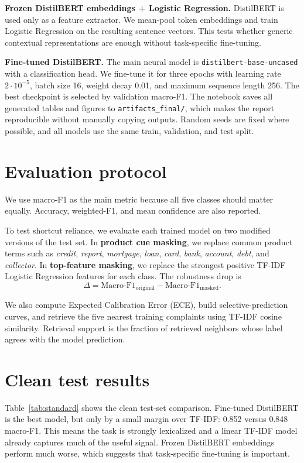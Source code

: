 \documentclass[11pt,twocolumn]{article}
\begin{document}
\textbf{Frozen DistilBERT embeddings + Logistic Regression.} DistilBERT is used only as a feature extractor. We mean-pool token embeddings and train Logistic Regression on the resulting sentence vectors. This tests whether generic contextual representations are enough without task-specific fine-tuning.

\textbf{Fine-tuned DistilBERT.} The main neural model is \texttt{distilbert-base-uncased} with a classification head. We fine-tune it for three epochs with learning rate $2\cdot10^{-5}$, batch size 16, weight decay 0.01, and maximum sequence length 256. The best checkpoint is selected by validation macro-F1. The notebook saves all generated tables and figures to \texttt{artifacts\_final/}, which makes the report reproducible without manually copying outputs. Random seeds are fixed where possible, and all models use the same train, validation, and test split.

\section{Evaluation protocol}
We use macro-F1 as the main metric because all five classes should matter equally. Accuracy, weighted-F1, and mean confidence are also reported.

To test shortcut reliance, we evaluate each trained model on two modified versions of the test set. In \textbf{product cue masking}, we replace common product terms such as \textit{credit}, \textit{report}, \textit{mortgage}, \textit{loan}, \textit{card}, \textit{bank}, \textit{account}, \textit{debt}, and \textit{collector}. In \textbf{top-feature masking}, we replace the strongest positive TF-IDF Logistic Regression features for each class. The robustness drop is
\[
\Delta = \text{Macro-F1}_{\text{original}} - \text{Macro-F1}_{\text{masked}}.
\]

We also compute Expected Calibration Error (ECE), build selective-prediction curves, and retrieve the five nearest training complaints using TF-IDF cosine similarity. Retrieval support is the fraction of retrieved neighbors whose label agrees with the model prediction.

\section{Clean test results}
Table~\ref{tab:standard} shows the clean test-set comparison. Fine-tuned DistilBERT is the best model, but only by a small margin over TF-IDF: 0.852 versus 0.848 macro-F1. This means the task is strongly lexicalized and a linear TF-IDF model already captures much of the useful signal. Frozen DistilBERT embeddings perform much worse, which suggests that task-specific fine-tuning is important.
\end{document}
